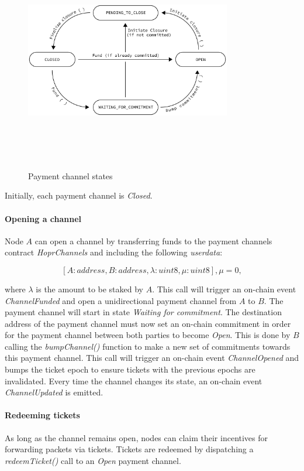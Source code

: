 \begin{figure}[H]
    \centering
    \includegraphics[width=9cm,height=9cm,keepaspectratio]{../yellowpaper/images/statesTransition.png}
    \label{fig:payment channel states}
    \caption{Payment channel states}
\end{figure}
Initially, each payment channel is \textit{Closed}.

\paragraph{Opening a channel} Node $A$ can open a channel by transferring funds to the payment channels contract \textit{HoprChannels} and including the following \textit{userdata}:

$$[A: address, B: address, \lambda: uint8, \mu: uint8], \mu = 0,$$

where $\lambda$ is the amount to be staked by $A$. This call will trigger an on-chain event \textit{ChannelFunded} and open a unidirectional payment channel from $A$ to $B$. The payment channel will start in state \textit{Waiting for commitment}. The destination address of the payment channel must now set an on-chain commitment in order for the payment channel between both parties to become \textit{Open}. This is done by $B$ calling the \textit{bumpChannel()} function to make a new set of commitments towards this payment channel. This call will trigger an on-chain event \textit{ChannelOpened} and bumps the ticket epoch to ensure tickets with the previous epochs are invalidated. Every time the channel changes its state, an on-chain event \textit{ChannelUpdated} is emitted.

\paragraph{Redeeming tickets}
As long as the channel remains open, nodes can claim their incentives for forwarding packets via tickets. Tickets are redeemed by dispatching a \textit{redeemTicket()} call to an \textit{Open} payment channel.

